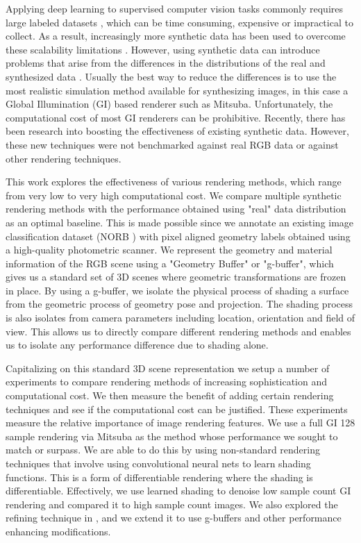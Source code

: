 \documentclass[10pt,twocolumn,letterpaper]{article}
\begin{document}
Applying deep learning to supervised computer vision tasks commonly requires large labeled datasets \cite{imagenet, coco}, which can be time consuming, expensive or impractical to collect. As a result, increasingly more synthetic data has been used to overcome these scalability limitations \cite{DBLP:journals/corr/RichterVRK16, DBLP:journals/corr/ShafaeiLS16, DBLP:journals/corr/ZhangSYSLJF16, DBLP:journals/corr/SixtWL17}. However, using synthetic data can introduce problems that arise from the differences in the distributions of the real and synthesized data \cite{2014arXiv1409.7495G}. Usually the best way to reduce the differences is to use the most realistic simulation method available for synthesizing images, in this case a Global Illumination (GI) based renderer such as Mitsuba\cite{Mitsuba}.  Unfortunately, the computational cost of most GI renderers can be prohibitive.  Recently, there has been research into boosting the effectiveness of existing synthetic data\cite{DBLP:journals/corr/ShrivastavaPTSW16}.  However, these new techniques were not benchmarked against real RGB data or against other rendering techniques.

This work explores the effectiveness of various rendering methods, which range from very low to very high computational cost. We compare multiple synthetic rendering methods with the performance obtained using "real" data distribution as an optimal baseline. This is made possible since we annotate an existing image classification dataset (NORB \cite{LeCun:2004:LMG:1896300.1896315}) with pixel aligned geometry labels obtained using a high-quality photometric scanner. We represent the geometry and material information of the RGB scene using a "Geometry Buffer" or "g-buffer", which gives us a standard set of 3D scenes where geometric transformations are frozen in place. By using a g-buffer, we isolate the physical process of shading a surface from the geometric process of geometry pose and projection.  The shading process is also isolates from camera parameters including location, orientation and field of view. This allows us to directly compare different rendering methods and enables us to isolate any performance difference due to shading alone.

Capitalizing on this standard 3D scene representation we setup a number of experiments to compare rendering methods of increasing sophistication and computational cost.  We then measure the benefit of adding certain rendering techniques and see if the computational cost can be justified.  These experiments measure the relative importance of image rendering features. We use a full GI 128 sample rendering via Mitsuba as the method whose performance we sought to match or surpass.
We are able to do this by using non-standard rendering techniques that involve using convolutional neural nets to learn shading functions.  This is a form of differentiable rendering where the shading is differentiable. Effectively, we use learned shading to denoise low sample count GI rendering and compared it to high sample count images.  We also explored the refining technique in \cite{DBLP:journals/corr/ShrivastavaPTSW16}, and we extend it to use g-buffers and other performance enhancing modifications.
\end{document}
